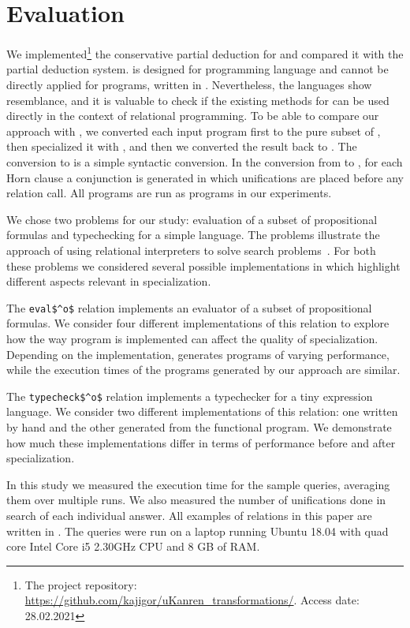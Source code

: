 \section{Evaluation}
\label{evaluation}

We implemented\footnote{The project repository: \url{https://github.com/kajigor/uKanren_transformations/}. Access date: 28.02.2021} the conservative partial deduction for \mk and compared it with the \ecce partial deduction system.
\ecce is designed for \pro programming language and cannot be directly applied for programs, written in \mk.
Nevertheless, the languages show resemblance, and it is valuable to check if the existing methods for \pro can be used directly in the context of relational programming.
To be able to compare our approach with \ecce, we converted each input program first to the pure subset of \pro, then specialized it with \ecce, and then we converted the result back to \mk.
The conversion to \pro is a simple syntactic conversion. In the conversion from \pro to \mk, for each Horn clause a conjunction is generated in which unifications are placed before any relation call.
All programs are run as \mk programs in our experiments.

We chose two problems for our study: evaluation of a subset of propositional formulas and typechecking for a simple language.
The problems illustrate the approach of using relational interpreters to solve search problems~\cite{lozov2019relational}.
For both these problems we considered several possible implementations in \mk which highlight different aspects relevant in specialization.

The \lstinline{eval$^o$} relation implements an evaluator of a subset of propositional formulas.
We consider four different implementations of this relation to explore how the way program is implemented can affect the quality of specialization.
Depending on the implementation, \ecce generates programs of varying performance, while the execution times of the programs generated by our approach are similar.

The \lstinline{typecheck$^o$} relation implements a typechecker for a tiny expression language.
We consider two different implementations of this relation: one written by hand and the other generated from the functional program.
We demonstrate how much these implementations differ in terms of performance before and after specialization.

In this study we measured the execution time for the sample queries, averaging them over multiple runs.
We also measured the number of unifications done in search of each individual answer.
All examples of \mk relations in this paper are written in \oc.
The queries were run on a laptop running Ubuntu 18.04 with quad core Intel Core i5 2.30GHz CPU and 8 GB of RAM.

